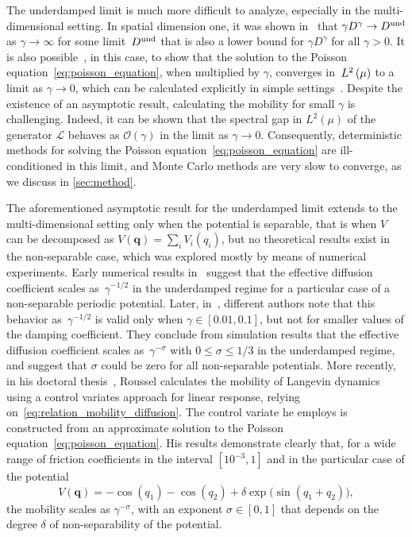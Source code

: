 \documentclass[11pt,a4paper]{article}
\newcommand{\vect}[1]{\boldsymbol{\mathbf #1}}
\theoremstyle{plain}
\numberwithin{equation}{section}
\renewcommand{\leq}{\leqslant}
\begin{document}
The underdamped limit is much more difficult to analyze,
especially in the multi-dimensional setting.
In spatial dimension one, it was shown in~\cite{MR2394704} that $\gamma D^{\gamma} \to D^{\rm und}$ as $\gamma \to \infty$ for some limit~$D^{\rm und}$
that is also a lower bound for $\gamma D^{\gamma}$ for all $\gamma > 0$.
It is also possible~\cite[Lemma 3.4]{MR2394704}, in this case,
to show that the solution to the Poisson equation~\eqref{eq:poisson_equation},
when multiplied by $\gamma$, converges in~$\lp{2}{\mu}$ to a limit as $\gamma \to 0$,
which can be calculated explicitly in simple settings~\cite{MR2427108}.
Despite the existence of an asymptotic result,
calculating the mobility for small $\gamma$ is challenging.
Indeed, it can be shown that the spectral gap in $L^2(\mu)$ of the generator $\mathcal L$ behaves as $\mathcal O(\gamma)$ in the limit as $\gamma \to 0$.
Consequently, deterministic methods for solving the Poisson equation~\eqref{eq:poisson_equation} are ill-conditioned in this limit,
and Monte Carlo methods are very slow to converge,
as we discuss in \cref{sec:method}.

The aforementioned asymptotic result for the underdamped limit extends to the multi-dimensional setting only when the potential is separable,
that is when $V$ can be decomposed as $V(\vect q) = \sum_i V_i(q_i)$,
but no theoretical results exist in the non-separable case,
which was explored mostly by means of numerical experiments.
Early numerical results in~\cite{chen1996surface} suggest that the effective diffusion coefficient scales as~$\gamma^{-1/2}$ in the underdamped regime for a particular case of a non-separable periodic potential.
Later, in~\cite{Braun02},
different authors note that this behavior as~$\gamma^{-1/2}$ is valid only when $\gamma \in [0.01, 0.1]$,
but not for smaller values of the damping coefficient.
They conclude from simulation results that the effective diffusion coefficient scales as~$\gamma^{-\sigma}$ with $0 \leq \sigma \leq 1/3$ in the underdamped regime,
and suggest that $\sigma$ could be zero for all non-separable potentials.
More recently, in his doctoral thesis~\cite{roussel_thesis},
Roussel calculates the mobility of Langevin dynamics using a control variates approach for linear response,
relying on~\eqref{eq:relation_mobility_diffusion}.
The control variate he employs is constructed from an approximate solution to the Poisson equation~\eqref{eq:poisson_equation}.
His results demonstrate clearly that, for a wide range of friction coefficients in the interval $[10^{-3}, 1]$
and in the particular case of the potential
\begin{equation}
    \label{eq:potential_julien}
    V(\vect q) = - \cos(q_1) - \cos(q_2) + \delta \exp \bigl(\sin(q_1 + q_2)\bigr),
\end{equation}
the mobility scales as $\gamma^{- \sigma}$,
with an exponent $\sigma \in [0, 1]$ that depends on the degree $\delta$ of non-separability of the potential.
\end{document}

